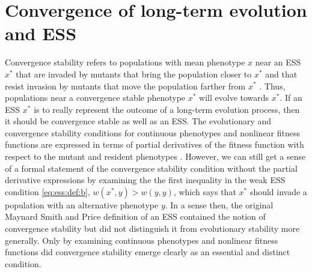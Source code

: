 \documentclass[11pt]{article}
\newcommand{\w}{w}
\newcommand{\ess}[1]{#1^*}
\begin{document}
\section{Convergence of long-term evolution and ESS}

Convergence stability refers to populations with mean phenotype $x$ near an ESS $\ess{x}$ that are invaded by mutants that bring the population closer to $\ess{x}$ and that resist invasion by mutants that move the population farther from $\ess{x}$ \cite{Eshel:1983,Taylor:1989}. Thus, populations near a convergence stable phenotype $\ess{x}$ will evolve towards $\ess{x}$. If an ESS $\ess{x}$ is to really represent the outcome of a long-term evolution process, then it should be convergence stable as well as an ESS. The evolutionary and convergence stability conditions for continuous phenotypes and nonlinear fitness functions are expressed in terms of partial derivatives of the fitness function with respect to the mutant and resident phenotypes \cite{Eshel:1983,Taylor:1989,Geritz:Kisdi:1998}. However, we can still get a sense of a formal statement of the convergence stability condition without the partial derivative expressions by examining the the first inequality in the weak ESS condition \eqref{eq:ess:def:b}, $\w(\ess{x}, y) > \w(y, y)$, which says that $\ess{x}$ should invade a population with an alternative phenotype $y$. In a sense then, the original Maynard Smith and Price definition of an ESS \cite{Maynard-Smith:Price:1973,Maynard-Smith:1974} contained the notion of convergence stability but did not distinguish it from evolutionary stability more generally. Only by examining continuous phenotypes and nonlinear fitness functions did convergence stability emerge clearly as an essential and distinct condition.
\end{document}
